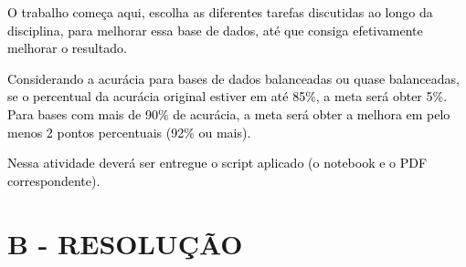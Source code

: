 \textcolor{black}{O trabalho começa aqui, escolha as diferentes tarefas discutidas ao longo da disciplina, para melhorar
essa base de dados, até que consiga efetivamente melhorar o resultado.}



\textcolor{black}{Considerando a acurácia para bases de dados balanceadas ou quase balanceadas, se o percentual da
acurácia original estiver em até 85\%, a meta será obter 5\%. Para bases com mais de 90\% de acurácia, a meta será
obter a melhora em pelo menos 2 pontos percentuais (92\% ou mais).}



\textcolor{black}{Nessa atividade deverá ser entregue o script aplicado (o notebook e o PDF correspondente).}



\section*{\textbf{B - RESOLUÇÃO}}
\lipsum[30]